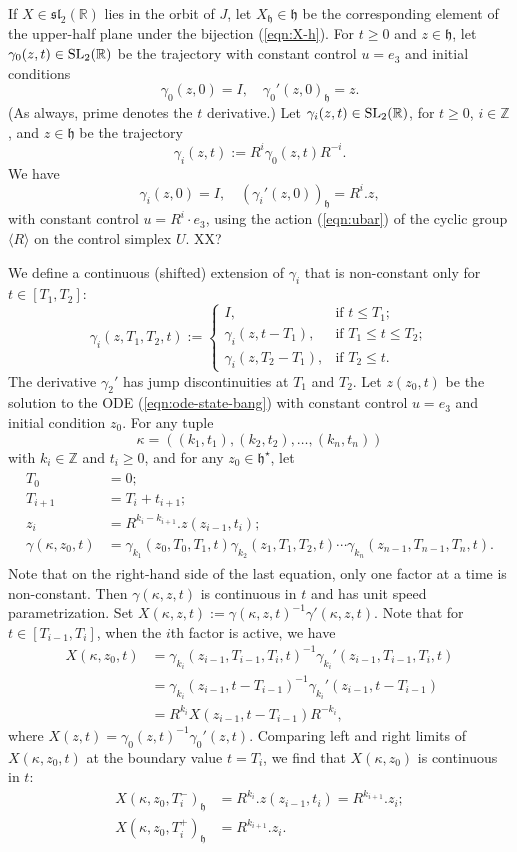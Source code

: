 \documentclass{article}
\theoremstyle{remark}
\newcommand{\ring}[1]{\mathbb{#1}}
\newcommand{\op}[1]{\hbox{#1}}
\def\sl{\mathfrak{sl}_2(\ring{R})}
\def\SL{\op{SL}_2(\ring{R})}
\def\h{\mathfrak h}
\def\hstar{{\mathfrak h}^\star}
\begin{document}
If $X\in \sl$ lies in the orbit of $J$, let $X_\h\in \h$ be the
corresponding element of the upper-half plane under the bijection
(\ref{eqn:X-h}).  For $t\ge 0$ and $z\in\h$, let $\gamma_0(z,t)\in
\SL$ be the trajectory with constant control $u=e_3$ and initial
conditions
\[
\gamma_0(z,0)=I,\quad \gamma_0'(z,0)_\h =  z.
\]
 (As always, prime denotes the
$t$ derivative.)
Let $\gamma_i(z,t)\in \SL$, for $t\ge 0$, $i\in\ring{Z}$, and $z\in
\h$ be the trajectory
\[
\gamma_i (z,t) := R^i \gamma_0(z,t) R^{-i}.
\]
We have 
\[
\gamma_i(z,0) = I,\quad 
(\gamma_i'(z,0))_\h = R^i.z,
\]
with constant control $u=R^i\cdot e_3$, using the action
(\ref{eqn:ubar}) of the cyclic group $\langle R\rangle$ on the control
simplex $U$. XX?

We define a continuous (shifted) extension of $\gamma_i$ that is
non-constant only for $t\in [T_1,T_2]$:
\[
\gamma_i(z,T_1,T_2,t) := \begin{cases} 
I, & \text{if } t \le T_1;\\
\gamma_i(z,t-T_1), &\text{if } T_1\le t\le T_2;\\
\gamma_i(z,T_2-T_1), &\text{if } T_2\le t.
\end{cases}
\]
The derivative $\gamma_2'$ has jump discontinuities at $T_1$ and
$T_2$.  Let $z(z_0,t)$ be the solution to the ODE
(\ref{eqn:ode-state-bang}) with constant control $u=e_3$ and
initial condition $z_0$.  For any tuple 
\[
\kappa =
((k_1,t_1),(k_2,t_2),\ldots,(k_{n},t_{n}))
\]
 with $k_i\in\ring{Z}$ and
$t_i\ge 0$, and for any $z_0\in \hstar$, let
\begin{align}
\begin{split}
T_0 &= 0;\\
T_{i+1} &= T_i + t_{i+1};\\
z_{i} &= R^{k_i -k_{i+1}}. z(z_{i-1},t_i);\\
\gamma(\kappa,z_0,t) &= \gamma_{k_1}(z_0,T_0,T_1,t) 
\gamma_{k_2}(z_1,T_1,T_2,t)\cdots \gamma_{k_n}(z_{n-1},T_{n-1},T_n,t).
\end{split}
\end{align}
Note that on the right-hand side of the last equation, only one factor
at a time is non-constant.  Then $\gamma(\kappa,z,t)$ is continuous in
$t$ and has unit speed parametrization.  Set $X(\kappa,z,t):=
\gamma(\kappa,z,t)^{-1} \gamma'(\kappa,z,t)$.  Note that for $t\in
[T_{i-1},T_{i}]$, when the $i$th factor is active, we have
\begin{align*}
X(\kappa,z_0,t) &= \gamma_{k_i}(z_{i-1},T_{i-1},T_{i},t)^{-1} 
\gamma_{k_i}'(z_{i-1},T_{i-1},T_{i},t) \\
  &=\gamma_{k_i}(z_{i-1},t-T_{i-1})^{-1}\gamma_{k_i}'(z_{i-1},t-T_{i-1})\\
  &= R^{k_i} X(z_{i-1},t - T_{i-1}) R^{-k_i},
\end{align*}
where $X(z,t) = \gamma_0(z,t)^{-1} \gamma_0'(z,t)$.  Comparing left
and right limits of $X(\kappa,z_0,t)$ at the boundary value $t=T_i$, we
find that $X(\kappa,z_0)$ is continuous in $t$:
\begin{align*}
X(\kappa,z_0,T_i^-)_\h &= R^{k_i}. z(z_{i-1},t_i) = R^{k_{i+1}}.z_i;\\
X(\kappa,z_0,T_i^+)_\h &= R^{k_{i+1}}.z_i.
\end{align*}
\end{document}
